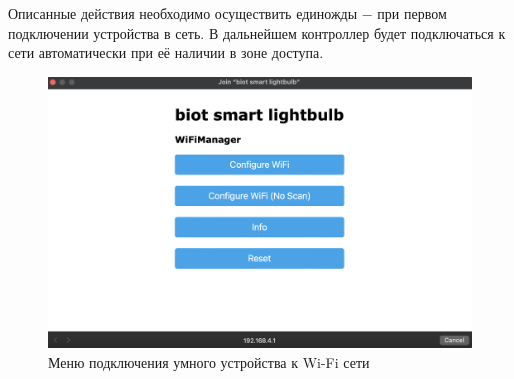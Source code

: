 	Описанные действия необходимо осуществить единожды $-$ при первом подключении устройства в сеть.
	В дальнейшем контроллер будет подключаться к сети автоматически при её наличии в зоне доступа.
	
	\begin{figure}[H]
		\centering
		\includegraphics[scale=0.5]{resources/wifi-manager-1}
		\caption{Меню подключения умного устройства к Wi-Fi сети}
		\label{fig4.3}
	\end{figure}

	
	
	